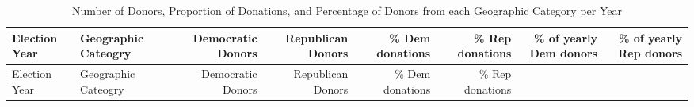 \documentclass[10pt,]{article}
\begin{document}
\begin{longtable}[]{@{}llrrrrrr@{}}
\caption{Number of Donors, Proportion of Donations, and Percentage of
Donors from each Geographic Category per Year}\tabularnewline
\toprule
\begin{minipage}[b]{0.07\columnwidth}\raggedright
Election Year\strut
\end{minipage} & \begin{minipage}[b]{0.14\columnwidth}\raggedright
Geographic Cateogry\strut
\end{minipage} & \begin{minipage}[b]{0.09\columnwidth}\raggedleft
Democratic Donors\strut
\end{minipage} & \begin{minipage}[b]{0.09\columnwidth}\raggedleft
Republican Donors\strut
\end{minipage} & \begin{minipage}[b]{0.08\columnwidth}\raggedleft
\% Dem donations\strut
\end{minipage} & \begin{minipage}[b]{0.08\columnwidth}\raggedleft
\% Rep donations\strut
\end{minipage} & \begin{minipage}[b]{0.12\columnwidth}\raggedleft
\% of yearly Dem donors\strut
\end{minipage} & \begin{minipage}[b]{0.12\columnwidth}\raggedleft
\% of yearly Rep donors\strut
\end{minipage}\tabularnewline
\midrule
\endfirsthead
\toprule
\begin{minipage}[b]{0.07\columnwidth}\raggedright
Election Year\strut
\end{minipage} & \begin{minipage}[b]{0.14\columnwidth}\raggedright
Geographic Cateogry\strut
\end{minipage} & \begin{minipage}[b]{0.09\columnwidth}\raggedleft
Democratic Donors\strut
\end{minipage} & \begin{minipage}[b]{0.09\columnwidth}\raggedleft
Republican Donors\strut
\end{minipage} & \begin{minipage}[b]{0.08\columnwidth}\raggedleft
\% Dem donations\strut
\end{minipage} & \begin{minipage}[b]{0.08\columnwidth}\raggedleft
\% Rep donations\strut
\end{minipage} & \begin{minipage}[b]{0.12\columnwidth}\raggedleft

\end{minipage}
\end{longtable}
\end{document}
